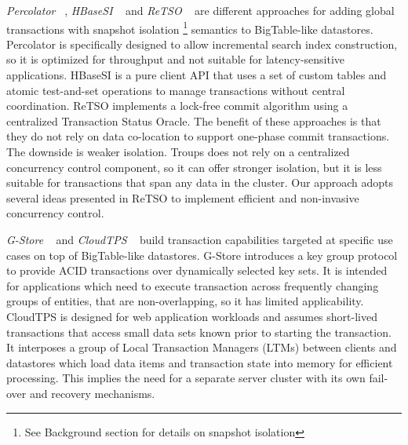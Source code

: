 \documentclass[10pt,final,journal]{IEEEtran}
\begin{document}
\emph{Percolator} ~\cite{Peng:2010:LIP:1924943.1924961}, \emph{HBaseSI} ~\cite{Zhang:2010:5697970} and \emph{ReTSO} ~\cite{Junqueira:2011:LTS:2056318.2057148} are different approaches for adding global transactions with snapshot isolation \footnote{See Background section for details on snapshot isolation} semantics to BigTable-like datastores. Percolator is specifically designed to allow incremental search index construction, so it is optimized for throughput and not suitable for latency-sensitive applications. HBaseSI is a pure client API that uses a set of custom tables and atomic test-and-set operations to manage transactions without central coordination. ReTSO implements a lock-free commit algorithm using a centralized Transaction Status Oracle. The benefit of these approaches is that they do not rely on data co-location to support one-phase commit transactions. The downside is weaker isolation. Troups does not rely on a centralized concurrency control component, so it can offer stronger isolation, but it is less suitable for transactions that span any data in the cluster. Our approach adopts several ideas presented in ReTSO to implement efficient and non-invasive concurrency control.

\emph{G-Store} ~\cite{Das:2010:GSD:1807128.1807157} and \emph{CloudTPS} ~\cite{Wei:2011:5740834} build transaction capabilities targeted at specific use cases on top of BigTable-like datastores. G-Store introduces a key group protocol to provide ACID transactions over dynamically selected key sets. It is intended for applications which need to execute transaction across frequently changing groups of entities, that are non-overlapping, so it has limited applicability. CloudTPS is designed for web application workloads and assumes short-lived transactions that access small data sets known prior to starting the transaction. It interposes a group of Local Transaction Managers (LTMs) between clients and datastores which load data items and transaction state into memory for efficient processing. This implies the need for a separate server cluster with its own fail-over and recovery mechanisms.
\end{document}
